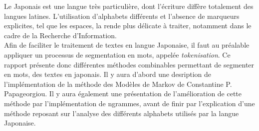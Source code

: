 
Le Japonais est une langue très particulière, dont l'écriture diffère totalement des langues latines. L'utilisation d'alphabets différents et l'absence de marqueurs explicites, tel que les espaces, la rende plus délicate à traiter, notamment dans le cadre de la Recherche d'Information.\\

Afin de faciliter le traitement de textes en langue Japonaise, il faut au préalable appliquer un processus de segmentation en mots, appelée \textit{tokenisation}. Ce rapport présente donc différentes méthodes combinables permettant de segmenter en mots, des textes en japonais. Il y aura d'abord une desription de l'implémentation de la méthode des Modèles de Markov de Constantine P. Papageorgiou\cite{Papageorgiou:001}. Il y aura également une présentation de l'amélioration de cette méthode par l'implémentation de ngrammes, avant de finir par l'explication d'une méthode reposant sur l'analyse des différents alphabets utilisés par la langue Japonaise.\\
